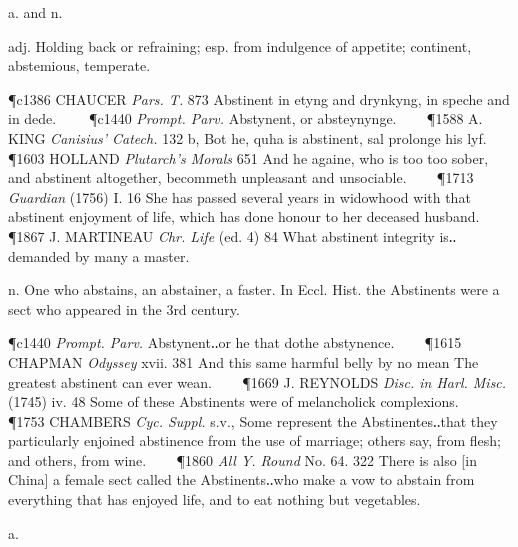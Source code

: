 \begin{description}[wide, labelwidth=!, labelindent=0pt]
 a. and n.

\noindent {}

\vspace{-0.3cm}

\begin{myenumerate}
 adj. Holding back or refraining; esp. from indulgence of appetite;
continent, abstemious, temperate. 

\P c1386 CHAUCER \textit{Pars. T.} 873 Abstinent in etyng and drynkyng, in speche and in
dede.     
\P c1440 \textit{Prompt. Parv.} Abstynent, or absteynynge.    
\P 1588 A. KING \textit{Canisius' Catech.} 132 b, Bot he, quha is abstinent, sal prolonge his lyf.
\P 1603 HOLLAND \textit{Plutarch's Morals} 651 And he againe, who is too too sober, and
abstinent altogether, becommeth unpleasant and unsociable.    
\P 1713 \textit{Guardian} (1756) I. 16 She has passed several years in widowhood with that abstinent
enjoyment of life, which has done honour to her deceased husband.    
\P 1867 J. MARTINEAU \textit{Chr. Life} (ed. 4) 84 What abstinent integrity is‥demanded by many a
master.

 n. One who abstains, an abstainer, a faster. In Eccl. Hist. the Abstinents
were a sect who appeared in the 3rd century. 

\P c1440 \textit{Prompt. Parv.} Abstynent‥or he that dothe abstynence.    
\P 1615 CHAPMAN \textit{Odyssey} xvii. 381 And this same harmful belly by no mean The greatest 
abstinent can ever wean.    
\P 1669 J. REYNOLDS \textit{Disc. in Harl. Misc.} (1745) iv. 48 Some of
these Abstinents were of melancholick complexions.    
\P 1753 CHAMBERS \textit{Cyc. Suppl.}
s.v., Some represent the Abstinentes‥that they particularly enjoined abstinence
from the use of marriage; others say, from flesh; and others, from wine.    
\P 1860 \textit{All Y. Round} No. 64. 322 There is also [in China] a female sect called the
Abstinents‥who make a vow to abstain from everything that has enjoyed life, and
to eat nothing but vegetables.
\end{myenumerate}

  a.

\noindent {}

\vspace{-0.3cm}


\end{description}
